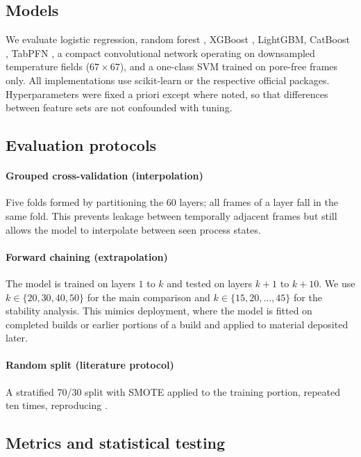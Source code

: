 \documentclass[preprint,12pt]{elsarticle}
\begin{document}
\subsection{Models}

We evaluate logistic regression, random forest \cite{breiman2001}, XGBoost \cite{chen2016}, LightGBM, CatBoost \cite{prokhorenkova2018}, TabPFN \cite{hollmann2025}, a compact convolutional network operating on downsampled temperature fields ($67\times67$), and a one-class SVM trained on pore-free frames only. All implementations use scikit-learn \cite{pedregosa2011} or the respective official packages. Hyperparameters were fixed a priori except where noted, so that differences between feature sets are not confounded with tuning.

\subsection{Evaluation protocols}

\paragraph{Grouped cross-validation (interpolation)} Five folds formed by partitioning the 60 layers; all frames of a layer fall in the same fold. This prevents leakage between temporally adjacent frames but still allows the model to interpolate between seen process states.

\paragraph{Forward chaining (extrapolation)} The model is trained on layers $1$ to $k$ and tested on layers $k+1$ to $k+10$. We use $k\in\{20,30,40,50\}$ for the main comparison and $k\in\{15,20,\dots,45\}$ for the stability analysis. This mimics deployment, where the model is fitted on completed builds or earlier portions of a build and applied to material deposited later.

\paragraph{Random split (literature protocol)} A stratified 70/30 split with SMOTE applied to the training portion, repeated ten times, reproducing \cite{ayyildizli2025}.

\subsection{Metrics and statistical testing}
\end{document}
